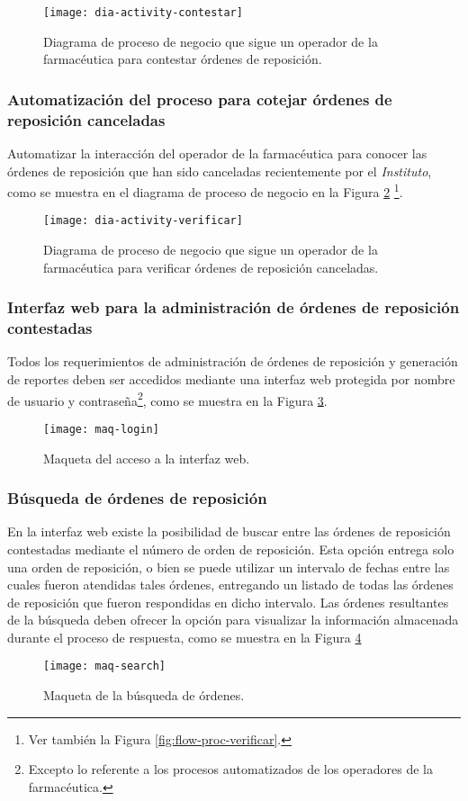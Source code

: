 \begin{figure}[h]
  \centering
  \texttt{[image: dia-activity-contestar]}
  \caption{Diagrama de proceso de negocio que sigue un operador de la farmacéutica para contestar órdenes de reposición.}
  \label{fig:dia-activity-contestar}
\end{figure}

\subsubsection{Automatización del proceso para cotejar órdenes de reposición canceladas}\label{sec:req-verificar}
Automatizar la interacción del operador de la farmacéutica para conocer las órdenes de reposición que han sido canceladas recientemente por el \textit{Instituto}, como se muestra en el diagrama de proceso de negocio en la Figura \ref{fig:dia-activity-verificar} \footnote{
Ver también la Figura \ref{fig:flow-proc-verificar}.}.
\begin{figure}[h]
  \centering
  \texttt{[image: dia-activity-verificar]}
  \caption{Diagrama de proceso de negocio que sigue un operador de la farmacéutica para verificar órdenes de reposición canceladas.}
  \label{fig:dia-activity-verificar}
\end{figure}

\subsubsection{Interfaz web para la administración de órdenes de reposición contestadas}\label{sec:req-web-ui}
Todos los requerimientos de administración de órdenes de reposición y generación de reportes deben ser accedidos mediante una interfaz web protegida por nombre de usuario y contraseña\footnote{Excepto lo referente a los procesos automatizados de los operadores de la farmacéutica.}, como se muestra en la Figura \ref{fig:maq-login}.
\begin{figure}[h]
  \centering
  \texttt{[image: maq-login]} 
  \caption{Maqueta del acceso a la interfaz web.}
  \label{fig:maq-login}
\end{figure} 

\subsubsection{Búsqueda de órdenes de reposición}\label{sec:req-search}
En la interfaz web existe la posibilidad de buscar entre las órdenes de reposición contestadas mediante el número de orden de reposición. Esta opción entrega solo una orden de reposición, o bien se puede utilizar un intervalo de fechas entre las cuales fueron atendidas tales órdenes, entregando un listado de todas las órdenes de reposición que fueron respondidas en dicho intervalo. Las órdenes resultantes de la búsqueda deben ofrecer la opción para visualizar la información almacenada durante el proceso de respuesta, como se muestra en la Figura \ref{fig:maq-search}
\begin{figure}[h]
  \centering
  \texttt{[image: maq-search]} 
  \caption{Maqueta de la búsqueda de órdenes.}
  \label{fig:maq-search}
\end{figure} 

